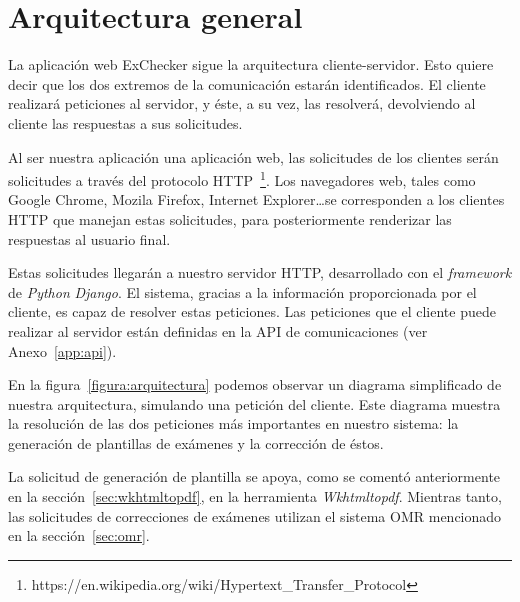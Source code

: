 \documentclass[a4paper, 12pt]{book}
\begin{document}
\section{Arquitectura general} 
\label{sec:arquitectura}

La aplicación web ExChecker sigue la arquitectura cliente-servidor. Esto
quiere decir que los dos extremos de la comunicación estarán identificados.
El cliente realizará peticiones al servidor, y éste, a su vez, las resolverá,
devolviendo al cliente las respuestas a sus solicitudes.

Al ser nuestra aplicación una aplicación web, las solicitudes de los clientes
serán solicitudes a través del protocolo
HTTP~\footnote{https://en.wikipedia.org/wiki/Hypertext\_Transfer\_Protocol}.
Los navegadores web, tales
como Google Chrome, Mozila Firefox, Internet Explorer\dots se corresponden
a los clientes HTTP que manejan estas solicitudes, para posteriormente
renderizar las respuestas al usuario final.

Estas solicitudes llegarán a nuestro servidor HTTP, desarrollado con el
\textit{framework} de \textit{Python} \textit{Django}. El sistema, gracias a la información proporcionada
por el cliente, es capaz de resolver estas peticiones. Las peticiones
que el cliente puede realizar al servidor están definidas en la API de
comunicaciones (ver Anexo~\ref{app:api}).

En la figura~\ref{figura:arquitectura} podemos observar un diagrama
simplificado de nuestra arquitectura, simulando una petición del cliente.
Este diagrama muestra la resolución de las dos peticiones más importantes
en nuestro sistema: la generación de plantillas de exámenes y la corrección
de éstos.

La solicitud de generación de plantilla se apoya, como se comentó anteriormente
en la sección~\ref{sec:wkhtmltopdf}, en la herramienta \textit{Wkhtmltopdf}.
Mientras tanto, las solicitudes de correcciones de exámenes utilizan el
sistema OMR mencionado en la sección~\ref{sec:omr}.
\end{document}

